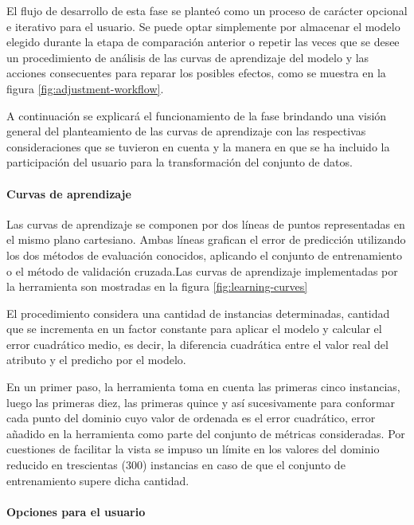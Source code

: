 El flujo de desarrollo de esta fase se planteó como un proceso de
carácter opcional e iterativo para el usuario. Se puede optar simplemente
por almacenar el modelo elegido durante la etapa de comparación anterior
o repetir las veces que se desee un procedimiento de análisis de las
curvas de aprendizaje del modelo y las acciones consecuentes para
reparar los posibles efectos, como se muestra en la figura \ref{fig:adjustment-workflow}.


A continuación se explicará el funcionamiento de la fase brindando
una visión general del planteamiento de las curvas de aprendizaje
con las respectivas consideraciones que se tuvieron en cuenta y la
manera en que se ha incluido la participación del usuario para la
transformación del conjunto de datos. 


\paragraph*{Curvas de aprendizaje}

Las curvas de aprendizaje se componen por dos líneas de puntos representadas
en el mismo plano cartesiano. Ambas líneas grafican el error de predicción
utilizando los dos métodos de evaluación conocidos, aplicando el conjunto
de entrenamiento o el método de validación cruzada.Las curvas de aprendizaje
implementadas por la herramienta son mostradas en la figura \ref{fig:learning-curves}

El procedimiento considera una cantidad de instancias determinadas,
cantidad que se incrementa en un factor constante para aplicar el
modelo y calcular el error cuadrático medio, es decir, la diferencia
cuadrática entre el valor real del atributo y el predicho por el modelo. 

En un primer paso, la herramienta toma en cuenta las primeras cinco
instancias, luego las primeras diez, las primeras quince y así sucesivamente
para conformar cada punto del dominio cuyo valor de ordenada es el
error cuadrático, error añadido en la herramienta como parte del conjunto
de métricas consideradas. Por cuestiones de facilitar la vista se
impuso un límite en los valores del dominio reducido en trescientas
(300) instancias en caso de que el conjunto de entrenamiento supere
dicha cantidad. 




\paragraph*{Opciones para el usuario}

